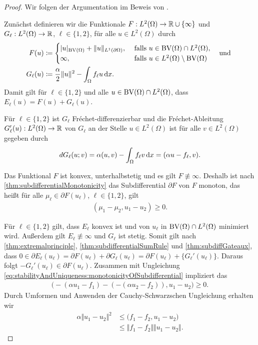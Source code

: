 \begin{proof}
  Wir folgen der Argumentation im Beweis von \cite[S. 304, Theorem 10.6]{Bar15}.

  Zunächst definieren wir die Funktionale $F: L^2(\Omega)\to
  \mathbb{R}\cup\{\infty\}$ und $G_\ell:L^2(\Omega)\to \mathbb{R}$, $\ell\in\{1,2\}$, für
  alle
  $u\in L^2(\Omega)$ durch
  \begin{align*}
    F(u) 
    &\coloneqq 
    \begin{cases}
      |u|_{\textup{BV}(\Omega)} + \Vert u \Vert_{L^1(\partial\Omega)}, 
      &\text{ falls } u\in\textup{BV}(\Omega)\cap L^2(\Omega),\\
      \infty,&\text{ falls } u\in L^2(\Omega)\setminus\textup{BV}(\Omega)
    \end{cases}
    \quad\text{und }\\
    G_\ell(u)
    &\coloneqq 
    \frac{\alpha}{2}\Vert u\Vert^2 - \int_\Omega f_\ell u\,\mathrm{d}x.
  \end{align*}
  Damit gilt für $\ell\in\{1,2\}$ und alle
  $u\in\textup{BV}(\Omega)\cap L^2(\Omega)$, dass $E_\ell(u) =  F(u)+G_\ell(u)$.

  Für $\ell\in\{1,2\}$ ist $G_\ell$ Fr\'echet-differenzierbar und die
  Fr\'echet-Ableitung $G_\ell'(u): L^2(\Omega)\to\mathbb{R}$ von $G_\ell$ an der
  Stelle $u\in L^2(\Omega)$ ist für alle $v\in L^2(\Omega)$
  gegeben durch
  \begin{align*}
    dG_\ell(u;v) = \alpha (u,v) - \int_\Omega f_\ell v\,\mathrm{d}x 
    = (\alpha u-f_\ell ,v).
  \end{align*}

  Das Funktional $F$ ist konvex, unterhalbstetig und es gilt $F\nequiv\infty$.
  Deshalb ist nach \cref{thm:subdifferentialMonotonicity} das Subdifferential
  $\partial F$ von $F$ monoton, das heißt für alle $\mu_\ell\in \partial
  F(u_\ell)$, $\ell\in\{1,2\}$, gilt
  \begin{align}\label{eq:stabilityAndUniqueness:monotonicityOfSubdifferential}
    (\mu_1-\mu_2,u_1-u_2)\geq 0.
  \end{align}

  Für $\ell\in\{1,2\}$ gilt, dass $E_\ell$ konvex ist und von $u_\ell$ in
  $\textup{BV}(\Omega)\cap L^2(\Omega)$ minimiert wird. 
  Außerdem gilt $E_\ell\nequiv\infty$ und $G_\ell$ ist stetig.
  Somit gilt nach \cref{thm:extremalprinciple}, 
  \cref{thm:subdifferentialSumRule} und \cref{thm:subdiffGateaux}, dass
  $0\in\partial E_\ell(u_\ell) = \partial F(u_\ell)+\partial
  G_\ell(u_\ell)=\partial F(u_\ell)+ \{G_\ell'(u_\ell)\}.$ 
  Daraus folgt
  $-G_\ell'(u_\ell)\in\partial F(u_\ell)$.
  Zusammen mit Ungleichung
  \eqref{eq:stabilityAndUniqueness:monotonicityOfSubdifferential}
  impliziert das
  \begin{align*}
    \big( -(\alpha u_1 - f_1) -(- (\alpha u_2 - f_2)), u_1 - u_2\big)
    \geq 0.
  \end{align*}
  Durch Umformen und Anwenden der Cauchy-Schwarzschen Ungleichung erhalten wir
  \begin{align*}
    \alpha \Vert u_1 - u_2 \Vert^2
    &\leq
    \big(f_1 -f_2, u_1-u_2 \big)\\
    &\leq
    \Vert f_1-f_2\Vert\Vert u_1 - u_2\Vert.
  \end{align*}


\end{proof}
